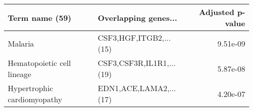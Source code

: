 \begin{tabular}{llr}
\toprule
             Term name (59) &     Overlapping genes... &  Adjusted p-value \\
\midrule
                    Malaria &   CSF3,HGF,ITGB2,...(15) &          9.51e-09 \\
 Hematopoietic cell lineage & CSF3,CSF3R,IL1R1,...(19) &          5.87e-08 \\
Hypertrophic cardiomyopathy &   EDN1,ACE,LAMA2,...(17) &          4.20e-07 \\
\bottomrule
\end{tabular}
